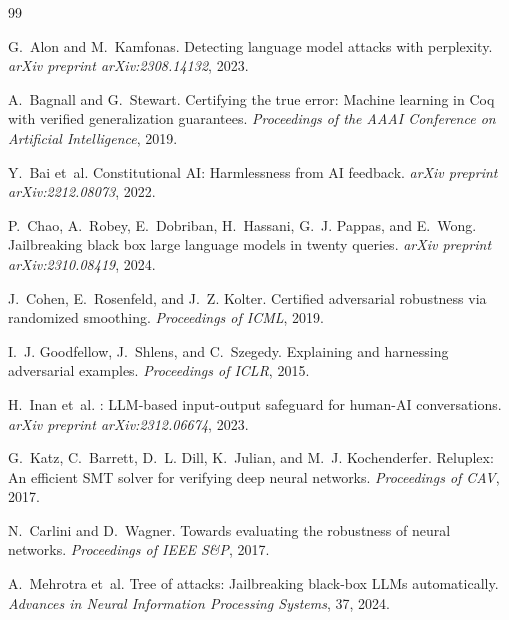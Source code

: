 \documentclass[11pt]{article}
\begin{document}





\begin{thebibliography}{99}

G.~Alon and M.~Kamfonas.
\newblock Detecting language model attacks with perplexity.
\newblock \emph{arXiv preprint arXiv:2308.14132}, 2023.

A.~Bagnall and G.~Stewart.
\newblock Certifying the true error: Machine learning in {Coq} with
  verified generalization guarantees.
\newblock \emph{Proceedings of the AAAI Conference on Artificial
Intelligence}, 2019.

Y.~Bai et~al.
\newblock Constitutional {AI}: Harmlessness from {AI} feedback.
\newblock \emph{arXiv preprint arXiv:2212.08073}, 2022.

P.~Chao, A.~Robey, E.~Dobriban, H.~Hassani, G.~J. Pappas, and
E.~Wong.
\newblock Jailbreaking black box large language models in twenty queries.
\newblock \emph{arXiv preprint arXiv:2310.08419}, 2024.

J.~Cohen, E.~Rosenfeld, and J.~Z. Kolter.
\newblock Certified adversarial robustness via randomized smoothing.
\newblock \emph{Proceedings of ICML}, 2019.

I.~J. Goodfellow, J.~Shlens, and C.~Szegedy.
\newblock Explaining and harnessing adversarial examples.
\newblock \emph{Proceedings of ICLR}, 2015.

H.~Inan et~al.
: {LLM}-based input-output safeguard for
  human-{AI} conversations.
\newblock \emph{arXiv preprint arXiv:2312.06674}, 2023.

G.~Katz, C.~Barrett, D.~L. Dill, K.~Julian, and
M.~J. Kochenderfer.
\newblock Reluplex: An efficient {SMT} solver for verifying deep neural
  networks.
\newblock \emph{Proceedings of CAV}, 2017.

N.~Carlini and D.~Wagner.
\newblock Towards evaluating the robustness of neural networks.
\newblock \emph{Proceedings of IEEE S\&P}, 2017.

A.~Mehrotra et~al.
\newblock Tree of attacks: Jailbreaking black-box {LLMs} automatically.
\newblock \emph{Advances in Neural Information Processing Systems}, 37,
2024.


\end{thebibliography}
\end{document}
